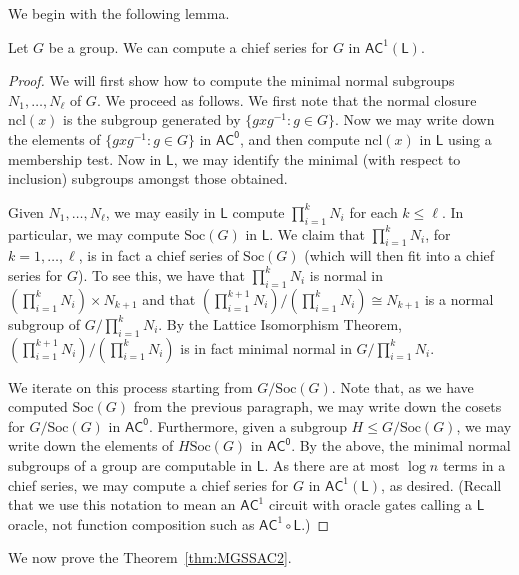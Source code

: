 \documentclass{theoretics}
\newcommand{\Soc}{\text{Soc}}
\newcommand*{\ComplexityClass}[1]{\ensuremath{\mathsf{#1}}\xspace}
\newcommand*{\LogSpace}{\ComplexityClass{L}}
\newcommand{\AC}{\ComplexityClass{AC}}
\newcommand{\ACz}{\ComplexityClass{AC^0}}
\begin{document}
We begin with the following lemma.

\begin{lemma} \label{lem:ChiefSeriesSAC2}
Let $G$ be a group. We can compute a chief series for $G$ in $\AC^{1}(\LogSpace)$.
\end{lemma}

\begin{proof}
We will first show how to compute the minimal normal subgroups $N_{1}, \ldots, N_{\ell}$ of $G$. We proceed as follows. We first note that the normal closure $\text{ncl}(x)$ is the subgroup generated by $\{ gxg^{-1} : g \in G \}$. Now we may write down the elements of $\{ gxg^{-1} : g \in G \}$ in $\ACz$, and then compute $\text{ncl}(x)$ in $\LogSpace$ using a membership test. Now in $\LogSpace$, we may identify the minimal (with respect to inclusion) subgroups amongst those obtained. 

Given $N_{1}, \ldots, N_{\ell}$, we may easily in $\LogSpace$ compute $\prod_{i=1}^{k} N_{i}$ for each $k \leq \ell$. In particular, we may compute $\Soc(G)$ in $\LogSpace$. 
We claim that $\prod_{i=1}^k N_i$, for $k=1,\dotsc,\ell$, is in fact a chief series of $\Soc(G)$ (which will then fit into a chief series for $G$). To see this, we have that $\prod _{i=1} ^k N_i$ is normal in $\left( \prod _{i=1} ^k N_i \right) \times N_{k+1}$ and that $(\prod _{i=1} ^{k+1} N_i ) / (\prod _{i=1} ^{k} N_i ) \cong N_{k+1}$ is a normal subgroup of $G / \prod_{i=1} ^k N_i $. By the Lattice Isomorphism Theorem, $(\prod _{i=1} ^{k+1} N_i ) / (\prod _{i=1} ^{k} N_i )$ is in fact minimal normal in $G / \prod_{i=1} ^k N_i $.

We iterate on this process starting from $G/\Soc(G)$. Note that, as we have computed  $\Soc(G)$ from the previous paragraph, we may write down the cosets for $G/\Soc(G)$ in $\ACz$. Furthermore, given a subgroup $H \leq G/\Soc(G)$, we may write down the elements of  $H\Soc(G)$ in $\ACz$. By the above, the minimal normal subgroups of a group are computable in $\LogSpace$. 
As there are at most $\log n$ terms in a chief series, we may compute a chief series for $G$ in $\AC^{1}(\LogSpace)$, as desired.  
(Recall that we use this notation to mean an $\AC^1$ circuit with oracle gates calling a $\LogSpace$ oracle, not function composition such as $\AC^1 \circ \LogSpace$.)
\end{proof}

We now prove the Theorem~\ref{thm:MGSSAC2}.
\end{document}
